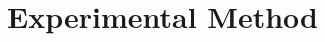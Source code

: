 \documentclass[11pt]{article}
\begin{document}
\section{Experimental Method}\label{sec:data}
%
%
\end{document}

